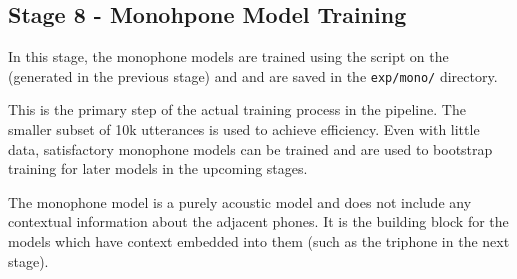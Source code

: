 \subsection{ Stage 8 - Monohpone Model Training  }
In this stage, the monophone models are trained using the  script on the  (generated in the previous stage) and  and are saved in the \texttt{exp/mono/} directory. 

This is the primary step of the actual training process in the pipeline. The smaller subset of 10k utterances is used to achieve efficiency. Even with little data, satisfactory monophone models can be trained and are used to bootstrap training for later models in the upcoming stages.

The monophone model is a purely acoustic model and does not include any contextual information about the adjacent phones. It is the building block for the models which have context embedded into them (such as the triphone in the next stage).


